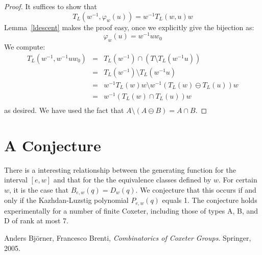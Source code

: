 \documentclass[10pt]{amsart}
\theoremstyle{definition}
\theoremstyle{definition}
\begin{document}
\begin{proof}
It suffices to show that
\[
T_L(w^{-1}, \varphi_w(u)) = w^{-1}T_L(w, u)w
\]
Lemma~\ref{ldescent} makes the proof easy, once we explicitly give the bijection as:
\[
\varphi_w(u) = w^{-1}uw_0
\]
We compute:
\[
\begin{array}{lcl}
T_L(w^{-1}, w^{-1}uw_0) &=& T_L(w^{-1}) \cap (T \setminus T_L(w^{-1}u))\\
&=& T_L(w^{-1}) \setminus T_L(w^{-1}u)\\
&=& w^{-1}T_L(w)w \setminus w^{-1}(T_L(w) \ominus T_L(u))w\\
&=& w^{-1}(T_L(w) \cap T_L(u))w\\
\end{array}
\]
as desired. We have used the fact that $A \setminus (A \ominus B) = A \cap B$.
\end{proof}

\section{A Conjecture}
There is a interesting relationship between the generating function for the interval $[e, w]$ and that for the the equivalence classes defined by $w$. For certain $w$, it is the case that $B_{e, w}(q) = D_{w}(q)$. We conjecture that this occurs if and only if the Kazhdan-Luzstig polynomial $P_{e, w}(q)$ equals 1. The conjecture holds experimentally for a number of finite Coxeter, including those of types A, B, and D of rank at most 7.

\begin{thebibliography}{9}

  Anders Bj\"{o}rner, Francesco Brenti,
  \emph{Combinatorics of Coxeter Groups}.
  Springer,
  2005.

\end{thebibliography}
\end{document}
